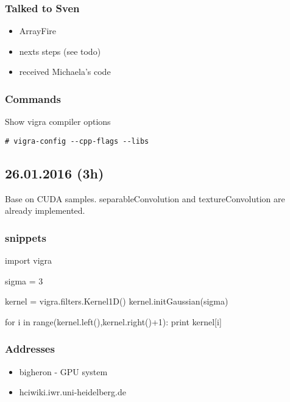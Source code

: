 \documentclass[12pt,a4paper]{article}
\begin{document}
  \subsubsection{Talked to Sven}
    \begin{itemize}
      \item ArrayFire
      \item nexts steps (see todo)
      \item received Michaela's code
    \end{itemize}

  \subsubsection{Commands}

    Show vigra compiler options
    \begin{lstlisting}[style=BashInputStyle]
    # vigra-config --cpp-flags --libs 
    \end{lstlisting}

\subsection{26.01.2016 (3h)}

  Base on CUDA samples. separableConvolution and textureConvolution are already implemented.

  \subsubsection{snippets}
    \begin{python}[caption="print out gaussian 1D kernel"]
      import vigra

      sigma = 3

      kernel = vigra.filters.Kernel1D()
      kernel.initGaussian(sigma)
      
      for i in range(kernel.left(),kernel.right()+1):
	print kernel[i]
    \end{python}

  \subsubsection{Addresses}
    \begin{itemize}
      \item bigheron - GPU system
      \item hciwiki.iwr.uni-heidelberg.de
    \end{itemize}
\end{document}
